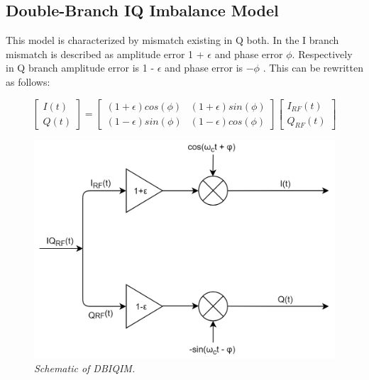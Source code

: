 \documentclass[en,printmode]{mgr}
\begin{document}
		\subsection*{Double-Branch IQ Imbalance Model}
			This model is characterized by mismatch existing in Q both. In the I branch 
			mismatch is described as amplitude error 1 + $\epsilon$ and phase error $\phi$.
			Respectively in Q branch amplitude error is 1 - $\epsilon$ and phase 
			error is $-\phi$ \cite{iq_model}. This can be rewritten as follows: 
			
			\vspace{1cm}
			\begin{equation}
				\begin{bmatrix}
					I(t) \\
					Q(t)
				\end{bmatrix}
				=
				\begin{bmatrix}
					(1 + \epsilon) cos(\phi) & (1 + \epsilon) sin(\phi) \\
					(1 - \epsilon) sin(\phi) & (1 - \epsilon) cos(\phi)
				\end{bmatrix}
				\begin{bmatrix}
					I_{RF}(t) \\
					Q_{RF}(t) 
				\end{bmatrix} \label{eq:DBIQIM}
			\end{equation}
			\vspace{0.5cm}
			\begin{figure}[H]
    		\centering
   				\includegraphics[width=\textwidth]{diag/dbiqm.png}
    			\caption{\textit{Schematic of DBIQIM.}}
			\end{figure}
			
\end{document}
